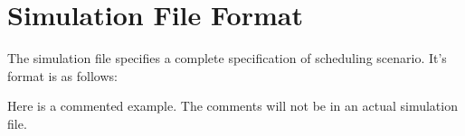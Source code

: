 \documentclass[main.tex]{subfiles}
\begin{document}
\section{Simulation File Format}
\label{sec:in-format}

The simulation file specifies a complete specification of scheduling scenario. It's format is as follows:



Here is a commented example. The comments will not be in an actual simulation file.


\end{document}
